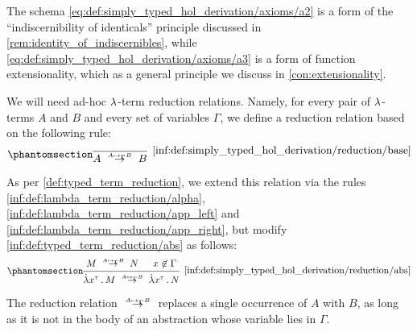 \begin{definition}
\begin{thmenum}[series=def:simply_typed_hol_derivation]
    The schema \eqref{eq:def:simply_typed_hol_derivation/axioms/a2} is a form of the \enquote{indiscernibility of identicals} principle discussed in \cref{rem:identity_of_indiscernibles}, while \eqref{eq:def:simply_typed_hol_derivation/axioms/a3} is a form of function extensionality, which as a general principle we discuss in \cref{con:extensionality}.

     We will need ad-hoc \( {\mathrm \lambda} \)-term reduction relations. Namely, for every pair of \( {\mathrm \lambda} \)-terms \( A \) and \( B \) and every set of variables \( \Gamma \), we define a reduction relation based on the following rule:
    \begin{equation*}\taglabel[\ensuremath{ \logic{Red}_{A \mapsto_\Gamma B} }]{inf:def:simply_typed_hol_derivation/reduction/base}
      \begin{prooftree}
        \infer0[\ref{inf:def:simply_typed_hol_derivation/reduction/base}]{ A \redrel{A \mapsto_\Gamma B} B }.
      \end{prooftree}
    \end{equation*}

    As per \cref{def:typed_term_reduction}, we extend this relation via the rules \ref{inf:def:lambda_term_reduction/alpha}, \ref{inf:def:lambda_term_reduction/app_left} and \ref{inf:def:lambda_term_reduction/app_right}, but modify \ref{inf:def:typed_term_reduction/abs} as follows:
    \begin{equation*}\taglabel[\ensuremath{ \logic{Abs}_{A \mapsto_\Gamma B} }]{inf:def:simply_typed_hol_derivation/reduction/abs}
      \begin{prooftree}
        \hypo{ M \redrel{A \mapsto_\Gamma B} N }
        \hypo{ x \not\in \Gamma }
        \infer2[\ref{inf:def:simply_typed_hol_derivation/reduction/abs}]{ \qabs {x^\tau} M \redrel{A \mapsto_\Gamma B} \qabs {x^\tau} N }.
      \end{prooftree}
    \end{equation*}

    The reduction relation \( {\redrel{A \mapsto_\Gamma B}} \) replaces a single occurrence of \( A \) with \( B \), as long as it is not in the body of an abstraction whose variable lies in \( \Gamma \).


\end{thmenum}
\end{definition}
